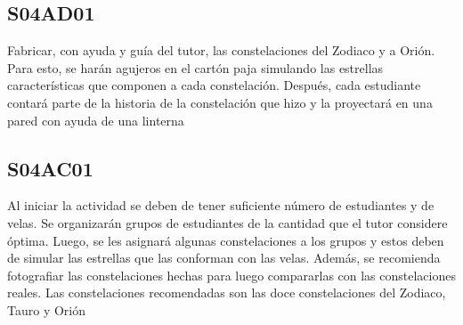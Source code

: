 \documentclass[10pt,a4paper]{article}
\begin{document}
\subsection{S04AD01}
Fabricar, con ayuda y guía del tutor, las constelaciones del Zodiaco y a Orión. Para esto, se harán agujeros en el cartón paja simulando las estrellas características que componen a cada constelación. Después, cada estudiante contará parte de la historia de la constelación que hizo y la proyectará en una pared con ayuda de una linterna

\subsection{S04AC01}
Al iniciar la actividad se deben de tener suficiente número de estudiantes y de velas. Se organizarán grupos de estudiantes de la cantidad que el tutor considere óptima. Luego, se les asignará algunas constelaciones a los grupos y estos deben de simular las estrellas que las conforman con las velas. Además, se recomienda fotografiar las constelaciones hechas para luego compararlas con las constelaciones reales. Las constelaciones recomendadas son las doce constelaciones del Zodiaco, Tauro y Orión
\end{document}
